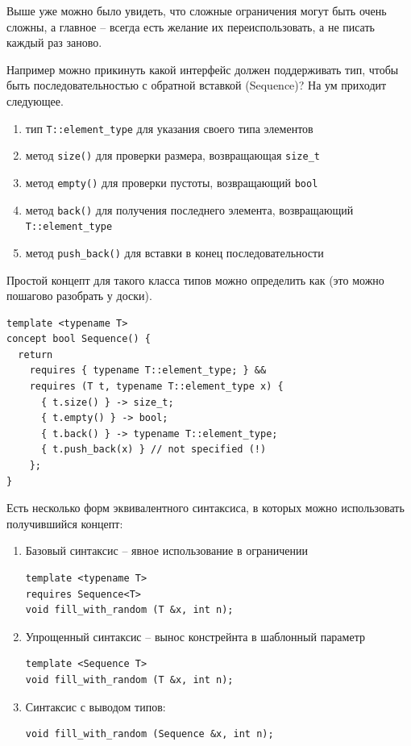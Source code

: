 \documentclass[a4paper,12pt,oneside]{article}
\begin{document}
Выше уже можно было увидеть, что сложные ограничения могут быть очень сложны, а главное -- всегда есть желание их переиспользовать, а не писать каждый раз заново.

Например можно прикинуть какой интерфейс должен поддерживать тип, чтобы быть последовательностью с обратной вставкой (Sequence)? На ум приходит следующее.

\begin{enumerate}
\item тип \lstinline!T::element_type! для указания своего типа элементов
\item метод \lstinline!size()! для проверки размера, возвращающая \lstinline!size_t!
\item метод \lstinline!empty()! для проверки пустоты, возвращающий \lstinline!bool!
\item метод \lstinline!back()! для получения последнего элемента, возвращающий \lstinline!T::element_type!
\item метод \lstinline!push_back()! для вставки в конец последовательности
\end{enumerate}

Простой концепт для такого класса типов можно определить как (это можно пошагово разобрать у доски).

\begin{lstlisting}
template <typename T>
concept bool Sequence() {
  return
    requires { typename T::element_type; } &&
    requires (T t, typename T::element_type x) {
      { t.size() } -> size_t;
      { t.empty() } -> bool;
      { t.back() } -> typename T::element_type;
      { t.push_back(x) } // not specified (!)
    };
}
\end{lstlisting}

Есть несколько форм эквивалентного синтаксиса, в которых можно использовать получившийся концепт:

\begin{enumerate}

\item Базовый синтаксис -- явное использование в ограничении 
\begin{lstlisting}
template <typename T> 
requires Sequence<T>
void fill_with_random (T &x, int n);
\end{lstlisting}

\item Упрощенный синтаксис -- вынос констрейнта в шаблонный параметр

\begin{lstlisting}
template <Sequence T> 
void fill_with_random (T &x, int n);
\end{lstlisting}

\item Синтаксис с выводом типов:

\begin{lstlisting}
void fill_with_random (Sequence &x, int n);
\end{lstlisting}

\end{enumerate}
\end{document}
